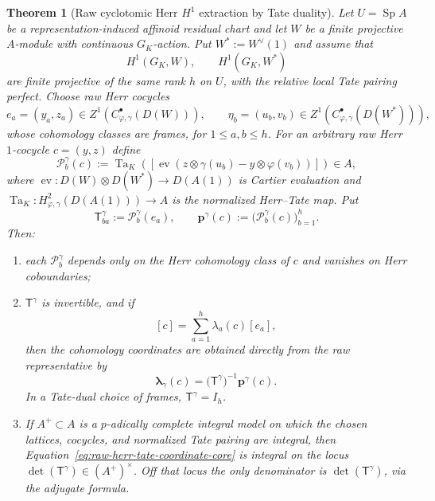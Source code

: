 \documentclass[11pt]{article}
\newtheorem{theorem}{Theorem}[section]
\theoremstyle{definition}
\begin{document}
\begin{theorem}[Raw cyclotomic Herr $H^1$ extraction by Tate duality]\label{thm:raw-herr-tate-extraction-core}
Let $U=\operatorname{Sp}A$ be a representation-induced affinoid residual chart and let $W$ be a finite projective $A$-module with continuous $G_K$-action.  Put $W^{\ast}:=W^{\vee}(1)$ and assume that
\[
 H^1(G_K,W),\qquad H^1(G_K,W^{\ast})
\]
are finite projective of the same rank $h$ on $U$, with the relative local Tate pairing perfect.  Choose raw Herr cocycles
\[
 e_a=(y_a,z_a)\in Z^1\!\left(C^\bullet_{\varphi,\gamma}(D(W))\right),
 \qquad
 \eta_b=(u_b,v_b)\in Z^1\!\left(C^\bullet_{\varphi,\gamma}(D(W^{\ast}))\right),
\]
whose cohomology classes are frames, for $1\le a,b\le h$.  For an arbitrary raw Herr $1$-cocycle $c=(y,z)$ define
\begin{equation}\label{eq:raw-herr-tate-functional-core}
 \mathcal P_b^{\gamma}(c)
 :=\operatorname{Ta}_{K}\!\left(
 \left[
 \operatorname{ev}\!\left(
 z\otimes\gamma(u_b)-y\otimes\varphi(v_b)
 \right)
 \right]
 \right)\in A,
\end{equation}
where $\operatorname{ev}:D(W)\otimes D(W^{\ast})\to D(A(1))$ is Cartier evaluation and $\operatorname{Ta}_{K}:H^2_{\varphi,\gamma}(D(A(1)))\to A$ is the normalized Herr--Tate map.  Put
\begin{equation}\label{eq:raw-herr-tate-matrix-core}
 \mathsf T^{\gamma}_{ba}:=\mathcal P_b^{\gamma}(e_a),
 \qquad
 \mathbf p^{\gamma}(c):=
 \bigl(\mathcal P_b^{\gamma}(c)\bigr)_{b=1}^{h}.
\end{equation}
Then:
\begin{enumerate}[label=\textnormal{(\roman*)}]
\item each $\mathcal P_b^{\gamma}$ depends only on the Herr cohomology class of $c$ and vanishes on Herr coboundaries;
\item $\mathsf T^{\gamma}$ is invertible, and if
\[
 [c]=\sum_{a=1}^{h}\lambda_a(c)[e_a],
\]
then the cohomology coordinates are obtained directly from the raw representative by
\begin{equation}\label{eq:raw-herr-tate-coordinate-core}
 \boxed{
 \boldsymbol\lambda_{\gamma}(c)
 =\bigl(\mathsf T^{\gamma}\bigr)^{-1}\mathbf p^{\gamma}(c).}
\end{equation}
In a Tate-dual choice of frames, $\mathsf T^{\gamma}=I_h$.
\item If $A^+\subset A$ is a $p$-adically complete integral model on which the chosen lattices, cocycles, and normalized Tate pairing are integral, then Equation~\eqref{eq:raw-herr-tate-coordinate-core} is integral on the locus $\det(\mathsf T^{\gamma})\in(A^+)^{\times}$.  Off that locus the only denominator is $\det(\mathsf T^{\gamma})$, via the adjugate formula.

\end{enumerate}
\end{theorem}
\end{document}
